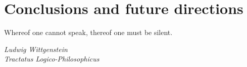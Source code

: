 \chapter*{Conclusions and future directions}

\epigraph{Whereof one cannot speak, thereof one must be silent.}{\textit{ Ludwig Wittgenstein \\ Tractatus Logico-Philosophicus}}